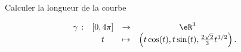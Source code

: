 \begin{exercice}\label{exocontrolecontinu0005}
  
Calculer la longueur de la courbe 

\begin{equation}
  \begin{array}{rccc}
    \gamma\, :& [0,4\pi] & \to &\eR^3 \\
     & t & \mapsto & \left(t\cos(t), t\sin(t), \frac{2\sqrt{2}}{3} t^{3/2}\right).
  \end{array}
  \end{equation}

\end{exercice}
